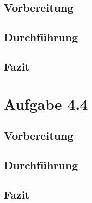 	\subsection{Vorbereitung}
		\begin{quote}
			
		\end{quote}
	\subsection{Durchführung}
		\begin{quote}
			
		\end{quote}
	\subsection{Fazit}
		\begin{quote}
			
		\end{quote}

\section{Aufgabe 4.4}
	\subsection{Vorbereitung}
		\begin{quote}
			
		\end{quote}
	\subsection{Durchführung}
		\begin{quote}
			
		\end{quote}
	\subsection{Fazit}
		\begin{quote}
			
		\end{quote}
